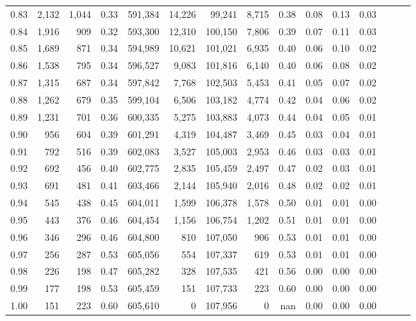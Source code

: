 \begin{tabular}{rrrrrrrrrrrrrrr}
0.83 &   2,132 &  1,044 &  0.33 &  591,384 &   14,226 &   99,241 &    8,715 &  0.38 &  0.08 &  0.13 &      0.03 \\
0.84 &   1,916 &    909 &  0.32 &  593,300 &   12,310 &  100,150 &    7,806 &  0.39 &  0.07 &  0.11 &      0.03 \\
0.85 &   1,689 &    871 &  0.34 &  594,989 &   10,621 &  101,021 &    6,935 &  0.40 &  0.06 &  0.10 &      0.02 \\
0.86 &   1,538 &    795 &  0.34 &  596,527 &    9,083 &  101,816 &    6,140 &  0.40 &  0.06 &  0.08 &      0.02 \\
0.87 &   1,315 &    687 &  0.34 &  597,842 &    7,768 &  102,503 &    5,453 &  0.41 &  0.05 &  0.07 &      0.02 \\
0.88 &   1,262 &    679 &  0.35 &  599,104 &    6,506 &  103,182 &    4,774 &  0.42 &  0.04 &  0.06 &      0.02 \\
0.89 &   1,231 &    701 &  0.36 &  600,335 &    5,275 &  103,883 &    4,073 &  0.44 &  0.04 &  0.05 &      0.01 \\
0.90 &     956 &    604 &  0.39 &  601,291 &    4,319 &  104,487 &    3,469 &  0.45 &  0.03 &  0.04 &      0.01 \\
0.91 &     792 &    516 &  0.39 &  602,083 &    3,527 &  105,003 &    2,953 &  0.46 &  0.03 &  0.03 &      0.01 \\
0.92 &     692 &    456 &  0.40 &  602,775 &    2,835 &  105,459 &    2,497 &  0.47 &  0.02 &  0.03 &      0.01 \\
0.93 &     691 &    481 &  0.41 &  603,466 &    2,144 &  105,940 &    2,016 &  0.48 &  0.02 &  0.02 &      0.01 \\
0.94 &     545 &    438 &  0.45 &  604,011 &    1,599 &  106,378 &    1,578 &  0.50 &  0.01 &  0.01 &      0.00 \\
0.95 &     443 &    376 &  0.46 &  604,454 &    1,156 &  106,754 &    1,202 &  0.51 &  0.01 &  0.01 &      0.00 \\
0.96 &     346 &    296 &  0.46 &  604,800 &      810 &  107,050 &      906 &  0.53 &  0.01 &  0.01 &      0.00 \\
0.97 &     256 &    287 &  0.53 &  605,056 &      554 &  107,337 &      619 &  0.53 &  0.01 &  0.01 &      0.00 \\
0.98 &     226 &    198 &  0.47 &  605,282 &      328 &  107,535 &      421 &  0.56 &  0.00 &  0.00 &      0.00 \\
0.99 &     177 &    198 &  0.53 &  605,459 &      151 &  107,733 &      223 &  0.60 &  0.00 &  0.00 &      0.00 \\
1.00 &     151 &    223 &  0.60 &  605,610 &        0 &  107,956 &        0 &   nan &  0.00 &  0.00 &      0.00 \\
\bottomrule
\end{tabular}
